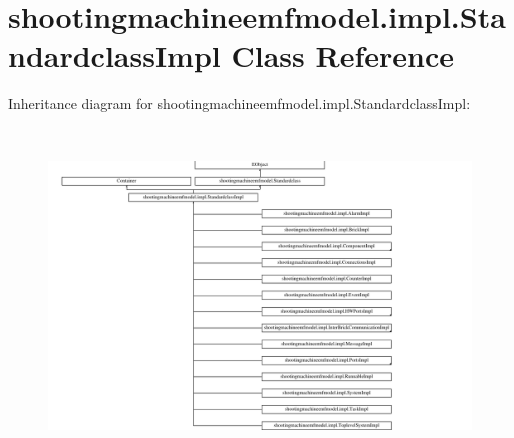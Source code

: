 \hypertarget{classshootingmachineemfmodel_1_1impl_1_1_standardclass_impl}{\section{shootingmachineemfmodel.\-impl.\-Standardclass\-Impl Class Reference}
\label{classshootingmachineemfmodel_1_1impl_1_1_standardclass_impl}
}
Inheritance diagram for shootingmachineemfmodel.\-impl.\-Standardclass\-Impl\-:\begin{figure}[H]
\begin{center}
\leavevmode
\includegraphics[height=8.864059cm]{classshootingmachineemfmodel_1_1impl_1_1_standardclass_impl}
\end{center}
\end{figure}
